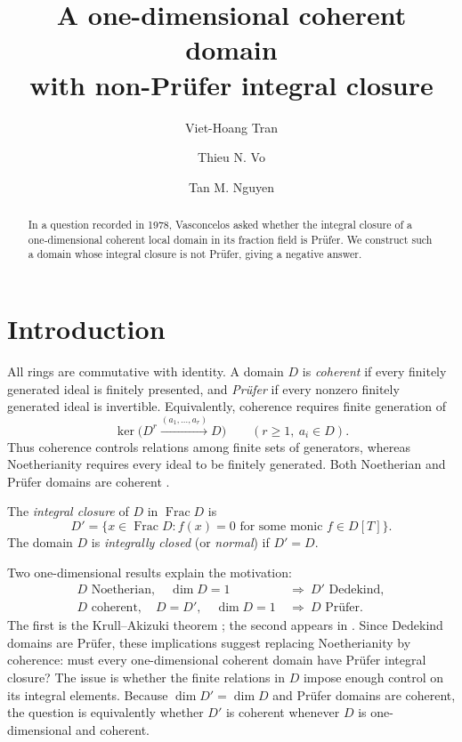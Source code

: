 \documentclass[11pt,reqno]{amsart}
\title[Coherence and integral closure]{A one-dimensional coherent domain\\
with non-Pr\"ufer integral closure}
\author{Viet-Hoang Tran}
\author{Thieu N. Vo}
\author{Tan M. Nguyen}
\numberwithin{equation}{section}
\theoremstyle{plain}
\DeclareMathOperator{\Frac}{Frac}
\begin{document}
\raggedbottom
\begin{abstract}
In a question recorded in 1978, Vasconcelos asked whether the integral
closure of a one-dimensional coherent local domain in its fraction field
is Pr\"ufer. We construct such a domain whose integral closure is not
Pr\"ufer, giving a negative answer.
\end{abstract}
\maketitle

\section{Introduction}\label{sec:introduction}

All rings are commutative with identity. A domain $D$ is
\emph{coherent} if every finitely generated ideal is finitely presented,
and \emph{Pr\"ufer} if every nonzero finitely generated ideal is
invertible. Equivalently, coherence requires finite generation of
\[
 \ker\bigl(D^r\xrightarrow{(a_1,\ldots,a_r)}D\bigr)
 \qquad(r\geq1,\ a_i\in D).
\]
Thus coherence controls relations among finite sets of generators,
whereas Noetherianity requires every ideal to be finitely generated.
Both Noetherian and Pr\"ufer domains are coherent
\cite[\S6]{GeroldingerKimLoper2026}.

The \emph{integral closure} of $D$ in $\Frac D$ is
\[
 D'=\{x\in\Frac D:f(x)=0\text{ for some monic }f\in D[T]\}.
\]
The domain $D$ is
\emph{integrally closed} (or \emph{normal}) if $D'=D$.

Two one-dimensional results explain the motivation:
\begin{equation}\label{eq:classical-motivation}
 \begin{aligned}
 D\text{ Noetherian},\quad\dim D=1
     &\ \Longrightarrow\ D'\text{ Dedekind},\\
 D\text{ coherent},\quad D=D',\quad\dim D=1
     &\ \Longrightarrow\ D\text{ Pr\"ufer}.
 \end{aligned}
\end{equation}
The first is the Krull--Akizuki theorem
\cite[Tag~09IG]{StacksProject}; the second appears in
\cite[Corollary~11]{PapickCoherentOverrings1979}.
Since Dedekind domains are Pr\"ufer, these implications suggest replacing
Noetherianity by coherence: must every one-dimensional coherent domain
have Pr\"ufer integral closure? The issue is
whether the finite relations in $D$ impose enough control on its
integral elements. Because $\dim D'=\dim D$ and Pr\"ufer domains are
coherent, the question is equivalently whether $D'$ is coherent
whenever $D$ is one-dimensional and coherent.
\end{document}
